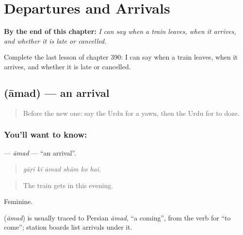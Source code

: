 
\chapter{Departures and Arrivals}
\label{ch:ur-departures-and-arrivals}

\begin{chapteropening}
\textbf{By the end of this chapter:} \emph{I can say when a train leaves, when it arrives, and whether it is late or cancelled.}

Complete the last lesson of chapter 390: I can say when a train leaves, when it arrives, and whether it is late or cancelled.
\end{chapteropening}

\section[\texorpdfstring{\ur{آمد} (āmad)}{آمد (āmad)}]{ (āmad) — an arrival}

\label{lesson:UR-C390-amad}



\begin{quote}
Before the new one: say the Urdu for a yawn, then the Urdu for to doze.
\end{quote}

\subsection*{You'll want to know: }
\textbf{} — \emph{āmad} — \textquotedblleft{}an arrival\textquotedblright{}.

\begin{quote}
     
\end{quote}

\begin{quote}
\emph{gāṛī kī āmad shām ko hai.}
\end{quote}

\begin{quote}
The train gets in this evening.
\end{quote}

Feminine.

\begin{cousinweb}
\textbf{} (\emph{āmad}) is usually traced to Persian \emph{āmad}, \textquotedblleft{}a coming\textquotedblright{}, from the verb for \textquotedblleft{}to come\textquotedblright{}; station boards list arrivals under it.
\end{cousinweb}

